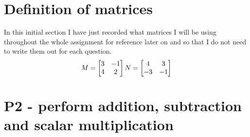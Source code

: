 \documentclass{article}
\begin{document}
\section{Definition of matrices}
In this initial section I have just recorded what matrices I will be using throughout the whole assignment for reference later on and so that I do not need to write them out for each question.
\begin{equation*}
	M =
	\begin{bmatrix}
		3 & -1\\
		4 & 2\\
	\end{bmatrix}
\\	N =
	\begin{bmatrix}
		4 & 3\\
		-3 & -1
	\end{bmatrix}
\end{equation*}
\section{P2 - perform addition, subtraction and scalar multiplication}
\end{document}
